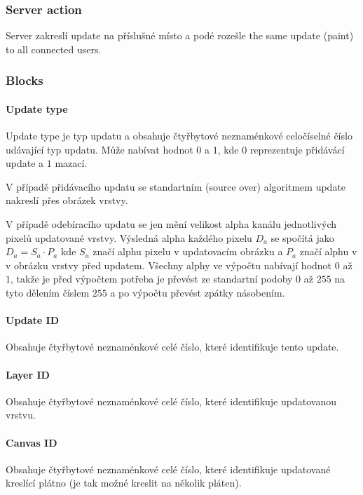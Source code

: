 \documentclass[12pt,oneside,a4paper]{report}
\begin{document}
\subsubsection{Server action}

Server zakreslí update na příslušné místo a podé rozešle the same update (paint) to all connected users.

\subsubsection{Blocks}

\paragraph{Update type}
Update type je typ updatu a obsahuje čtyřbytové neznaménkové celočíselné číslo udávající typ updatu. Může nabívat hodnot $0$ a $1$, kde $0$ reprezentuje přidávácí update a $1$ mazací.

V případě přidávacího updatu se standartním (source over) algoritmem update nakreslí přes obrázek vrstvy. 

V případě odebíracího updatu se jen mění velikost alpha kanálu jednotlivých pixelů updatované vrstvy. Výsledná alpha každého pixelu $D_{a}$ se spočítá jako $D_{a} = S_{a} \cdot P_{a}$ kde $S_{a}$ značí alphu pixelu v updatovacím obrázku a $P_{a}$ značí alphu v v obrázku vrstvy před updatem. Všechny alphy ve výpočtu nabívají hodnot $0$ až $1$, takže je před výpočtem potřeba je převést ze standartní podoby $0$ až $255$ na tyto dělením číslem $255$ a po výpočtu převést zpátky násobením.

\paragraph{Update ID}
Obsahuje čtyřbytové neznaménkové celé číslo, které identifikuje tento update.

\paragraph{Layer ID}
Obsahuje čtyřbytové neznaménkové celé číslo, které identifikuje updatovanou vrstvu.

\paragraph{Canvas ID}
Obsahuje čtyřbytové neznaménkové celé číslo, které identifikuje updatované kreslící plátno (je tak možné kreslit na několik pláten).
\end{document}
